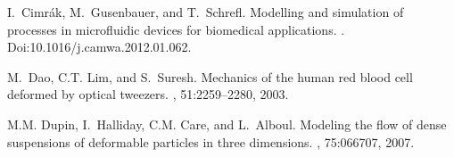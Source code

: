 \documentclass[a4paper]{article}
\begin{document}


\begin{thebibliography}{1}

I.~Cimr\'ak, M.~Gusenbauer, and T.~Schrefl.
\newblock Modelling and simulation of processes in microfluidic devices for
  biomedical applications.
.
\newblock Doi:10.1016/j.camwa.2012.01.062.

M.~Dao, C.T. Lim, and S.~Suresh.
\newblock Mechanics of the human red blood cell deformed by optical tweezers.
, 51:2259--2280, 2003.

M.M. Dupin, I.~Halliday, C.M. Care, and L.~Alboul.
\newblock Modeling the flow of dense suspensions of deformable particles in
  three dimensions.
, 75:066707, 2007.

\end{thebibliography}
\end{document}
